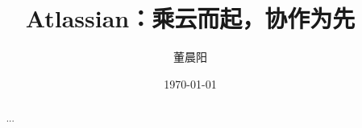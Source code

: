 \documentclass[a4paper,12pt]{ctexart}
\title{Atlassian：乘云而起，协作为先}
\author{董晨阳}
\date{\today}
\begin{document}
\maketitle
\begin{abstract}
    ...
\end{abstract}
\clearpage





\end{document}
